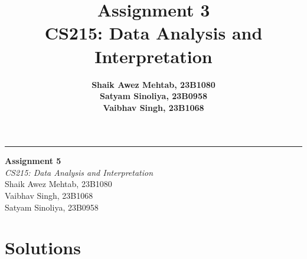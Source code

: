 \documentclass[oneside]{report}
\title{
\vspace{3cm} 
\Huge \textbf{Assignment 3}\\
\vspace{0.5cm}
\Large CS215: Data Analysis and Interpretation
\vspace{0.5cm}
}
\author{
    \textbf{Shaik Awez Mehtab, 23B1080} \\
    \textbf{Satyam Sinoliya, 23B0958} \\
    \textbf{Vaibhav Singh, 23B1068}
}
\date{}
\begin{document}
\begin{titlepage}
	\raggedleft
	\rule{1pt}{\textheight}
	\hspace{0.05\textwidth}
	\parbox[b]{0.75\textwidth}{
	{\Huge\bfseries Assignment 5\\[2\baselineskip]}
		{\Large\textit{CS215: Data Analysis and Interpretation}}\\[4\baselineskip]
	{\Large{Shaik Awez Mehtab, 23B1080 \\ Vaibhav Singh, 23B1068 \\ Satyam Sinoliya, 23B0958}}\\
	\vspace{0.5\textheight}
	}
\end{titlepage}
\chapter{Solutions}


\setcounter{equation}{0}

\end{document}

